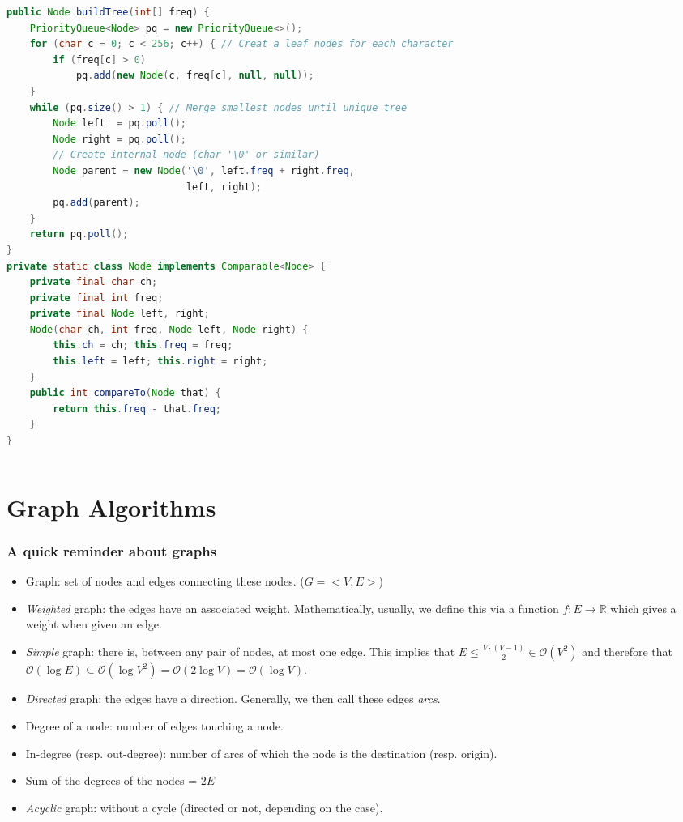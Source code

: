 \documentclass[8pt,aspectratio=169]{beamer}
\begin{document}
\begin{frame}[fragile]
\begin{columns}[T]
    \begin{column}{0.58\textwidth}
\begin{lstlisting}[language=Java, basicstyle=\tiny\ttfamily, keywordstyle=\color{blue}, frame=single]
public Node buildTree(int[] freq) {
    PriorityQueue<Node> pq = new PriorityQueue<>();
    for (char c = 0; c < 256; c++) { // Creat a leaf nodes for each character
        if (freq[c] > 0)
            pq.add(new Node(c, freq[c], null, null));
    }    
    while (pq.size() > 1) { // Merge smallest nodes until unique tree
        Node left  = pq.poll();
        Node right = pq.poll();
        // Create internal node (char '\0' or similar)
        Node parent = new Node('\0', left.freq + right.freq, 
                               left, right);
        pq.add(parent);
    }
    return pq.poll();
}
private static class Node implements Comparable<Node> {
    private final char ch;
    private final int freq;
    private final Node left, right;
    Node(char ch, int freq, Node left, Node right) {
        this.ch = ch; this.freq = freq;
        this.left = left; this.right = right;
    }
    public int compareTo(Node that) {
        return this.freq - that.freq;
    }
}
    \end{lstlisting}
    \end{column}
\end{columns}
\end{frame}

\section{Graph Algorithms}


\begin{frame}
\frametitle{A quick reminder about graphs}
\begin{itemize}
	\item Graph: set of nodes and edges connecting these nodes. ($G=<V,E>$)
	\item \textit{Weighted} graph: the edges have an associated weight. Mathematically, usually, we define this via a function $f: E \rightarrow \mathbb{R}$ which gives a weight when given an edge.
	\item \textit{Simple} graph: there is, between any pair of nodes, at most one edge. This implies that $E \leq \frac{V\cdot(V-1)}{2} \in \mathcal{O}(V^2)$ and therefore that $\mathcal{O}(\log E) \subseteq \mathcal{O}(\log V^2) = \mathcal{O}(2 \log V) = \mathcal{O}(\log V)$.
	\item \textit{Directed} graph: the edges have a direction. Generally, we then call these edges \textit{arcs}.
	\item Degree of a node: number of edges touching a node.
	\item In-degree (resp. out-degree): number of arcs of which the node is the destination (resp. origin).
	\item Sum of the degrees of the nodes = $2E$
	\item \textit{Acyclic} graph: without a cycle (directed or not, depending on the case).
\end{itemize}
\end{frame}
\end{document}
